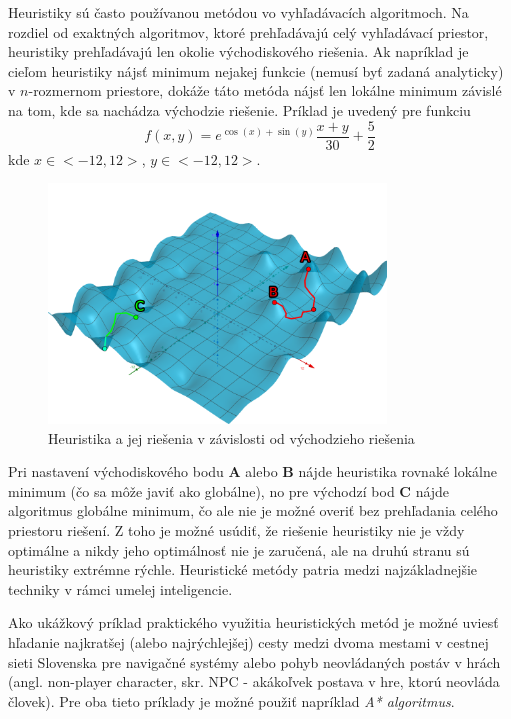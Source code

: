 Heuristiky sú často používanou metódou vo vyhľadávacích algoritmoch.
Na rozdiel od exaktných algoritmov, ktoré prehľadávajú celý vyhľadávací priestor, heuristiky prehľadávajú len okolie
východiskového riešenia.
Ak napríklad je cieľom heuristiky nájsť minimum nejakej funkcie (nemusí byť zadaná analyticky) v $n$-rozmernom priestore,
dokáže táto metóda nájsť len lokálne minimum závislé na tom, kde sa nachádza východzie riešenie.
Príklad je uvedený pre funkciu
\begin{equation}
    f(x,y)=e^{\cos(x)+\sin(y)}\frac{x+y}{30}+\frac{5}{2}
\end{equation}
kde $x\in<-12,12>$, $y\in<-12,12>$.
\begin{figure}[H]
    \centering
    \includegraphics[width=0.8\textwidth]{images/heuristic.png}
    \caption{Heuristika a jej riešenia v závislosti od východzieho riešenia}
\end{figure}\label{figure:heuristic-method}
Pri nastavení východiskového bodu \textbf{A} alebo \textbf{B} nájde heuristika rovnaké lokálne minimum (čo sa môže javiť
ako globálne), no pre východzí bod \textbf{C} nájde algoritmus globálne minimum, čo ale nie je možné overiť bez
prehľadania celého priestoru riešení.
Z toho je možné usúdiť, že riešenie heuristiky nie je vždy optimálne a nikdy jeho optimálnosť nie je zaručená, ale na
druhú stranu sú heuristiky extrémne rýchle.
Heuristické metódy patria medzi najzákladnejšie techniky v rámci umelej inteligencie.

Ako ukážkový príklad praktického využitia heuristických metód je možné uviesť hľadanie najkratšej (alebo najrýchlejšej)
cesty medzi dvoma mestami v cestnej sieti Slovenska pre navigačné systémy alebo pohyb neovládaných postáv v hrách
(angl. non-player character, skr. NPC - akákoľvek postava v hre, ktorú neovláda človek).
Pre oba tieto príklady je možné použiť napríklad \emph{A* algoritmus}.


